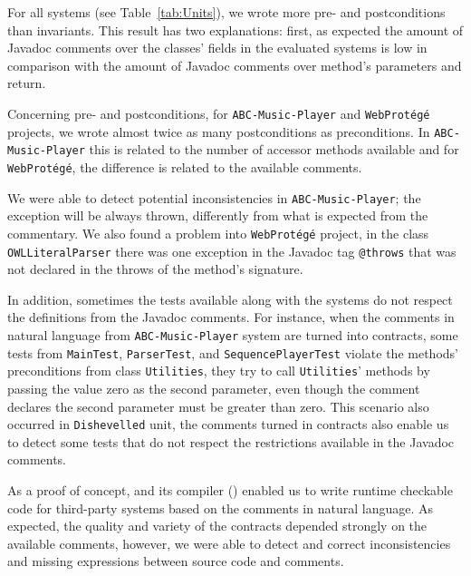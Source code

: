 For all systems (see Table~\ref{tab:Units}), we
wrote more pre- and postconditions than invariants. This result has two
explanations: first, as expected the amount of Javadoc comments over the
classes' fields in the evaluated systems is low in comparison with the amount
of Javadoc comments over method's parameters and return.


Concerning pre- and postconditions, for \texttt{ABC-Music-Player} and
\texttt{WebProt\'{e}g\'{e}} projects, we wrote almost twice as many postconditions
as preconditions.
In \texttt{ABC-Music-Player} this is related to the number of accessor methods
available and for \texttt{WebProt\'{e}g\'{e}}, the difference is related to
the available comments.
%


We were able to detect potential inconsistencies in \texttt{ABC-Mu\-sic-Player};
the exception will be always thrown, differently from what is expected from the
commentary.
We also found a problem into
\texttt{WebProt\'{e}g\'{e}} project, in the class \texttt{OWLLiteralParser} there was one exception
in the Javadoc tag \texttt{@throws} that was not declared in the throws of the method's signature.

In addition, sometimes the tests available along with the systems do
not respect the definitions from the Javadoc comments. For instance, when the
comments in natural language from \texttt{ABC-Music-Player} system are turned into
\contractjdoc{} contracts, some tests from
\texttt{MainTest}, \texttt{ParserTest}, and \texttt{SequencePlayerTest} violate
the methods' preconditions from class \texttt{Utilities}, they try to
call \texttt{Utilities}' methods by passing the value zero as the second
parameter, even though the comment declares the second parameter must be greater than zero.
This scenario also occurred in \texttt{Dishevelled} unit, the comments turned
in \contractjdoc{} contracts also enable us to detect some tests
that do not respect the restrictions available in the Javadoc comments.

As a proof of concept, \contractjdoc{} and its compiler (\contractjdocCompiler{}) enabled us to write runtime
checkable code for third-party systems based on the comments in natural
language.
As expected, the quality and variety of the contracts depended strongly on the available comments, however, we were able to
detect and correct inconsistencies and missing expressions between source code and comments.




